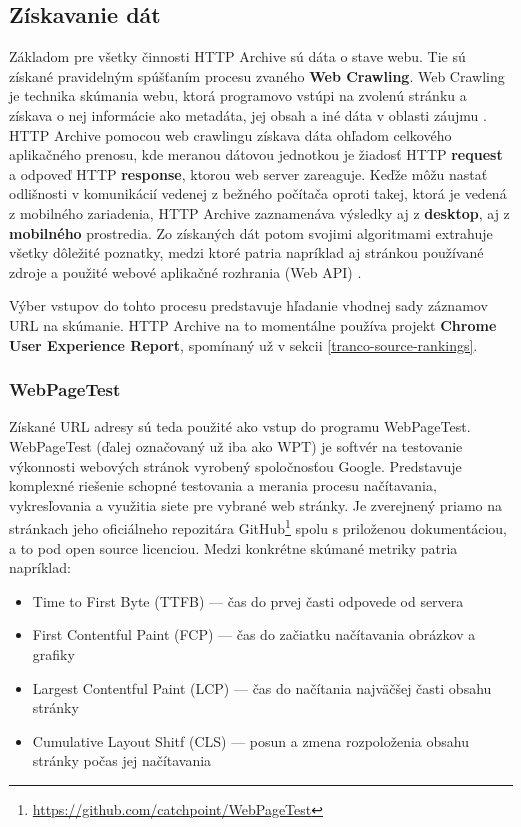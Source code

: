 \pagebreak

\subsection{Získavanie dát}
\label{fetching-data}

Základom pre všetky činnosti HTTP Archive sú dáta o stave webu. Tie sú získané pravidelným spúšťaním procesu zvaného \textbf{Web Crawling}.
Web Crawling je technika skúmania webu, ktorá programovo vstúpi na zvolenú stránku a získava o nej informácie ako metadáta, jej obsah a iné dáta v oblasti záujmu \cite{httparchive-webcrawling}.
HTTP Archive pomocou web crawlingu získava dáta ohľadom celkového aplikačného prenosu, kde meranou dátovou jednotkou je žiadosť HTTP \textbf{request} a odpoveď HTTP \textbf{response}, ktorou web server zareaguje. 
Keďže môžu nastať odlišnosti v komunikácií vedenej z bežného počítača oproti takej, ktorá je vedená z mobilného zariadenia, HTTP Archive zaznamenáva výsledky aj z \textbf{desktop}, aj z \textbf{mobilného} prostredia.
Zo získaných dát potom svojimi algoritmami extrahuje všetky dôležité poznatky, medzi ktoré patria napríklad aj stránkou používané zdroje a použité webové aplikačné rozhrania (Web API) \cite{httparchive-homepage}.

Výber vstupov do tohto procesu predstavuje hľadanie vhodnej sady záznamov URL na skúmanie. 
HTTP Archive na to momentálne používa projekt \textbf{Chrome User Experience Report}, spomínaný už v sekcii \ref{tranco-source-rankings}.

\subsubsection{WebPageTest}

Získané URL adresy sú teda použité ako vstup do programu WebPageTest. WebPageTest (ďalej označovaný už iba ako WPT) je softvér na testovanie výkonnosti webových stránok vyrobený spoločnosťou Google. Predstavuje komplexné riešenie schopné testovania a merania procesu načítavania, vykresľovania a využitia siete pre vybrané web stránky. 
Je zverejnený priamo na stránkach jeho oficiálneho repozitára GitHub\footnote{\href{https://github.com/catchpoint/WebPageTest}{https://github.com/catchpoint/WebPageTest}} spolu s priloženou dokumentáciou, a to pod open source licenciou.
Medzi konkrétne skúmané metriky patria napríklad: \cite{webpagetest}
\begin{itemize}
    \item Time to First Byte (TTFB) --- čas do prvej časti odpovede od servera
    \item First Contentful Paint (FCP) --- čas do začiatku načítavania obrázkov a grafiky
    \item Largest Contentful Paint (LCP) --- čas do načítania najväčšej časti obsahu stránky 
    \item Cumulative Layout Shitf (CLS) --- posun a zmena rozpoloženia obsahu stránky počas jej načítavania
\end{itemize}


